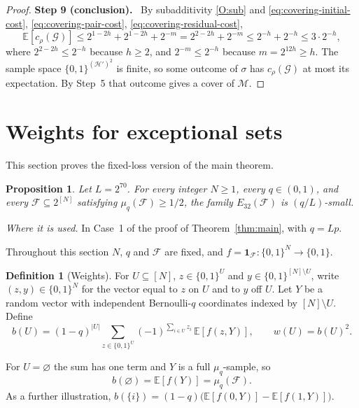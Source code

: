 \documentclass[11pt,letterpaper]{article}
\newtheorem{proposition}[theorem]{Proposition}
\theoremstyle{definition}
\newtheorem{definition}[theorem]{Definition}
\theoremstyle{remark}
\numberwithin{equation}{section}
\newcommand{\step}[1]{\par\medskip\noindent\textbf{#1}\ }
\begin{document}
\begin{proof}
\step{Step 9 (conclusion).}
By subadditivity \ref{O:sub} and
\eqref{eq:covering-initial-cost}, \eqref{eq:covering-pair-cost},
\eqref{eq:covering-residual-cost},
\[
\mathbb E[c_\rho(\mathcal G)]
\le2^{1-2h}+2^{1-2h}+2^{-m}
=2^{2-2h}+2^{-m}\le 2^{-h}+2^{-h}\le3\cdot2^{-h},
\]
where $2^{2-2h}\le2^{-h}$ because $h\ge2$, and $2^{-m}\le2^{-h}$ because
$m=2^{12h}\ge h$. The sample space $\{0,1\}^{(\mathcal H')^2}$ is finite,
so some outcome of $\sigma$ has $c_\rho(\mathcal G)$ at most its
expectation. By Step~5 that outcome gives a cover of $\mathcal M$.
\end{proof}

\section{Weights for exceptional sets}
\label{sec:weights}

This section proves the fixed-loss version of the main theorem.

\begin{proposition}\label{prop:half-density}
Let $L=2^{70}$. For every integer $N\ge1$, every $q\in(0,1)$, and every
$\mathcal F\subseteq 2^{[N]}$ satisfying $\mu_q(\mathcal F)\ge1/2$,
the family $E_{32}(\mathcal F)$ is $(q/L)$-small.
\end{proposition}

\emph{Where it is used.} In Case~1 of the proof of Theorem~\ref{thm:main},
with $q=Lp$.

Throughout this section $N$, $q$ and $\mathcal F$ are fixed, and
$f=\mathbf 1_{\mathcal F}\colon\{0,1\}^N\to\{0,1\}$.

\begin{definition}[Weights]\label{def:weights}
For $U\subseteq[N]$, $z\in\{0,1\}^U$ and $y\in\{0,1\}^{[N]\setminus U}$,
write $(z,y)\in\{0,1\}^N$ for the vector equal to $z$ on $U$ and to $y$
off $U$. Let $Y$ be a random vector with independent Bernoulli-$q$
coordinates indexed by $[N]\setminus U$. Define
\begin{equation}\label{eq:weights-definition}
 b(U)=(1-q)^{|U|}
 \sum_{z\in\{0,1\}^{U}}(-1)^{\sum_{i\in U}z_i}\,
 \mathbb E[f(z,Y)],
 \qquad w(U)=b(U)^2 .
\end{equation}
\end{definition}

For $U=\varnothing$ the sum has one term and $Y$ is a full $\mu_q$-sample,
so
\begin{equation}\label{eq:b-empty}
b(\varnothing)=\mathbb E[f(Y)]=\mu_q(\mathcal F).
\end{equation}
As a further illustration,
$b(\{i\})=(1-q)\bigl(\mathbb E[f(0,Y)]-\mathbb E[f(1,Y)]\bigr)$.
\end{document}
